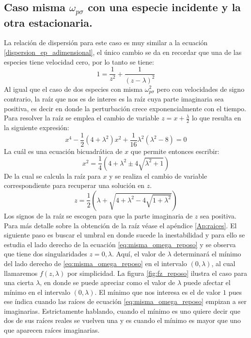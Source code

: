 \documentclass[12pt]{article}
\begin{document}
\subsection*{Caso misma $\omega_{p\sigma}$ con una especie incidente y la otra estacionaria.}
La relación de dispersión para este caso es muy similar a la ecuación \ref{dispersion_ep_adimensional}, el único cambio se da en recordar que una de las especies tiene velocidad cero, por lo tanto se tiene:
\begin{equation}
\label{eq:misma_omega_reposo}
1 = \frac{1}{z^2} + \frac{1}{(z-\lambda)^2}
\end{equation}
Al igual que el caso de dos especies con misma $\omega_{p\sigma}^2$ pero con velocidades de signo contrario, la raíz que nos es de interes es la raíz cuya parte imaginaria sea positiva, es decir en donde la perturbación crece exponencialmente con el tiempo. Para resolver la raíz se emplea el cambio de variable $z=x+\frac{\lambda}{2}$ lo que resulta en la siguiente expresión:
\begin{equation}
\label{eq:reducida_misma_reposo}
x^4 - \frac{1}{2}(4 + \lambda^2)x^2 + \frac{1}{16}\lambda^2 (\lambda^2 -8)=0
\end{equation}
La cuál es una ecuación bicuadrática de $x$ que permite entonces escribir:
\begin{equation}
\label{eq:bicuad_misma_reposo}
x^2 = \frac{1}{4}(4 + \lambda^2 \pm 4\sqrt{ \lambda^2 +1})
\end{equation}
De la cual se calcula la raíz para $x$ y se realiza el cambio de variable correspondiente para recuperar una solución en $z$.
\begin{equation}
\label{eq:solucion_misma_reposo}
z = \frac{1}{2}\left(\lambda + \sqrt{4 + \lambda ^2 - 4 \sqrt{1 + \lambda ^2}} \right)
\end{equation}
Los signos de la raíz se escogen para que la parte imaginaria de $z$ sea positiva. Para más detalle sobre la obtención de la raíz véase el apéndice \ref{Ap:raices}.
El siguiente paso es buscar el umbral en donde sucede la inestabilidad y para ello se estudia el lado derecho de la ecuación \ref{eq:misma_omega_reposo} y se observa que tiene dos singularidades $z=0,\lambda$. Aquí, el valor de $\lambda$ determinará el mínimo del lado derecho de \ref{eq:misma_omega_reposo} en el intervalo $(0,\lambda)$, al cual llamaremos $f(z,\lambda)$ por simplicidad. La figura \ref{fig:fz_reposo} ilustra el caso para una cierta $\lambda$, en donde se puede apreciar como el valor de $\lambda$ puede afectar el mínimo en el intervalo $(0,\lambda)$. El mínimo que nos interesa es el de valor $1$ pues ese índica cuando las raíces de ecuación \ref{eq:misma_omega_reposo} empizan a ser imaginarias. Estrictamente hablando, cuando el mínimo es uno quiere decir que dos de sus raíces reales se vuelven una y es cuando el mínimo es mayor que uno que aparecen raíces imaginarias.
\end{document}

